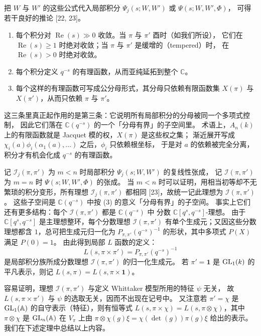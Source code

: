 把 $W$ 与 $W'$ 的这些公式代入局部积分 $\Psi_j(s;W,W')$ 或 $\Psi(s;W,W',\Phi)$，
可得若干良好的推论 [22, 23]。
\begin{enumerate}
\item 每个积分对 $\operatorname{Re}(s)\gg0$ 收敛。当 $\pi$ 与 $\pi'$ 酉时（如我们所设），
它们在 $\operatorname{Re}(s)\ge1$ 时绝对收敛；当 $\pi$ 与 $\pi'$ 是缓增的（tempered）时，
在 $\operatorname{Re}(s)>0$ 时绝对收敛。
\item 每个积分定义 $q^{-s}$ 的有理函数，从而亚纯延拓到整个 $\mathbb{C}$。
\item 每个这样的有理函数可写成公分母形式，其分母只依赖有限函数集 $X(\pi)$ 与
$X(\pi')$，从而只依赖 $\pi$ 与 $\pi'$。
\end{enumerate}
\begin{annote}
这三条里真正起作用的是第三条：它说明所有局部积分的分母被同一个多项式控制，
因此它们落在 $\mathbb{C}(q^{-s})$ 的一个「分母有界」的子空间里。
术语上，$A_n(k)$ 上的有限函数就是 Jacquet 模的权，$X(\pi)$ 是这些权之集；
渐近展开写成 $\chi_i(a)\phi_i(\alpha_1(a),\ldots)$ 之后，$\phi_i$ 只依赖根坐标，
于是对 $a$ 的依赖被完全分离，积分才有机会化成 $q^{-s}$ 的有理函数。
\par\vspace{0.15em}{\raggedleft 【来源：Jacquet--Piatetski-Shapiro--Shalika, Amer.\ J.\ Math.\ 105 (1983), §2 与 §9（A）】\par}
\end{annote}

记 $\mathcal{I}_j(\pi,\pi')$ 为 $m<n$ 时局部积分 $\Psi_j(s;W,W')$ 的复线性张成，
记 $\mathcal{I}(\pi,\pi')$ 为 $m=n$ 时 $\Psi(s;W,W',\Phi)$ 的张成。
当 $m<n$ 时可以证明，用相当初等却不无繁琐的积分变形，所有理想
$\mathcal{I}_j(\pi,\pi')$ 都相同 [23]，故统一记此理想为 $\mathcal{I}(\pi,\pi')$。
这些子空间是 $\mathbb{C}(q^{-s})$ 中按 (3) 的意义「分母有界」的子空间。
事实上它们还有更多结构：每个 $\mathcal{I}(\pi,\pi')$ 都是 $\mathbb{C}(q^{-s})$ 中
分数 $\mathbb{C}[q^s,q^{-s}]$-理想。
由于 $\mathbb{C}[q^s,q^{-s}]$ 是主理想整环，每个分数理想 $\mathcal{I}(\pi,\pi')$
有单个生成元；又因这些分数理想都含 $1$，总可把生成元归一化为
$P_{\pi,\pi'}(q^{-s})^{-1}$ 的形状，其中多项式 $P(X)$ 满足 $P(0)=1$。
由此得到局部 $L$ 函数的定义：
\[
L(s,\pi\times\pi')=P_{\pi,\pi'}(q^{-s})^{-1}
\]
是局部积分族所成分数理想 $\mathcal{I}(\pi,\pi')$ 的归一化生成元。
若 $\pi'=\mathbf{1}$ 是 $\mathrm{GL}_1(k)$ 的平凡表示，则记 $L(s,\pi)=L(s,\pi\times\mathbf{1})$。

容易证明，理想 $\mathcal{I}(\pi,\pi')$ 与定义 Whittaker 模型所用的特征 $\psi$ 无关，
故 $L(s,\pi\times\pi')$ 与 $\psi$ 的选取无关，因而不出现在记号中。
又注意若 $\pi'=\chi$ 是 $\mathrm{GL}_1(\mathbb{A})$ 的自守表示（特征），则有恒等式
$L(s,\pi\times\chi)=L(s,\pi\otimes\chi)$，其中 $\pi\otimes\chi$ 是 $\mathrm{GL}_n(\mathbb{A})$ 在
$V_\pi$ 上由 $\pi\otimes\chi(g)\xi=\chi(\det(g))\pi(g)\xi$ 给出的表示。
我们在下述定理中总结以上内容。

